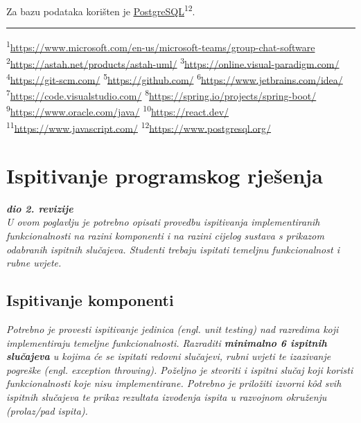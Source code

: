 			\indent Za bazu podataka korišten je \underline{\href{https://www.postgresql.org/}{PostgreSQL}}\textsuperscript{12}.
			\noindent\\[1ex]\rule{0.5\linewidth}{0.5pt}\newline
			\noindent\textsuperscript{1}\url{https://www.microsoft.com/en-us/microsoft-teams/group-chat-software}\newline
			\noindent\textsuperscript{2}\url{https://astah.net/products/astah-uml/}\newline
			\noindent\textsuperscript{3}\url{https://online.visual-paradigm.com/}\newline
			\noindent\textsuperscript{4}\url{https://git-scm.com/}\newline
			\noindent\textsuperscript{5}\url{https://github.com/}\newline
			\noindent\textsuperscript{6}\url{https://www.jetbrains.com/idea/}\newline
			\noindent\textsuperscript{7}\url{https://code.visualstudio.com/}\newline
			\noindent\textsuperscript{8}\url{https://spring.io/projects/spring-boot/}\newline
			\noindent\textsuperscript{9}\url{https://www.oracle.com/java/}\newline
			\noindent\textsuperscript{10}\url{https://react.dev/}\newline
			\noindent\textsuperscript{11}\url{https://www.javascript.com/}\newline
			\noindent\textsuperscript{12}\url{https://www.postgresql.org/}\newline
		
		\section{Ispitivanje programskog rješenja}
			
			\textbf{\textit{dio 2. revizije}}\\
			
			 \textit{U ovom poglavlju je potrebno opisati provedbu ispitivanja implementiranih funkcionalnosti na razini komponenti i na razini cijelog sustava s prikazom odabranih ispitnih slučajeva. Studenti trebaju ispitati temeljnu funkcionalnost i rubne uvjete.}
	
			
			\subsection{Ispitivanje komponenti}
			\textit{Potrebno je provesti ispitivanje jedinica (engl. unit testing) nad razredima koji implementiraju temeljne funkcionalnosti. Razraditi \textbf{minimalno 6 ispitnih slučajeva} u kojima će se ispitati redovni slučajevi, rubni uvjeti te izazivanje pogreške (engl. exception throwing). Poželjno je stvoriti i ispitni slučaj koji koristi funkcionalnosti koje nisu implementirane. Potrebno je priložiti izvorni kôd svih ispitnih slučajeva te prikaz rezultata izvođenja ispita u razvojnom okruženju (prolaz/pad ispita). }
			
